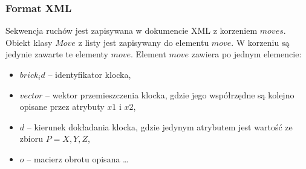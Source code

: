 \documentclass[12pt]{article}
\begin{document}
\subsubsection{Format XML}
Sekwencja ruchów jest zapisywana w dokumencie XML z korzeniem $moves$.
Obiekt klasy $Move$ z listy jest zapisywany do elementu $move$. W korzeniu
są jedynie zawarte te elementy $move$. Element $move$ zawiera po jednym
elemencie:
\begin{itemize}
	\item $brick_id$ -- identyfikator klocka,
	\item $vector$ -- wektor przemieszczenia klocka, gdzie jego współrzędne
		są kolejno opisane przez atrybuty $x1$ i $x2$,
	\item $d$ -- kierunek dokładania klocka, gdzie jedynym atrybutem
		jest wartość ze zbioru $P = {X,Y,Z}$,
	\item $o$ -- macierz obrotu opisana \ldots
\end{itemize}
\end{document}
